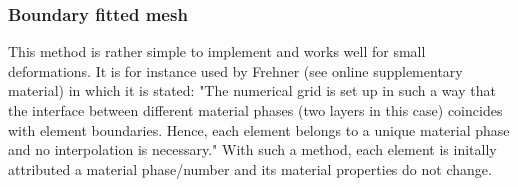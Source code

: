 \subsubsection{Boundary fitted mesh}

This method is rather simple to implement and works well for small deformations. It is 
for instance used by Frehner \cite{freh14} (see online supplementary material) in which it is 
stated: "The numerical grid is set up in such a way that the interface
between different material phases (two layers in this case) coincides with element boundaries. Hence, each
element belongs to a unique material phase and no interpolation is necessary."
With such a method, each element is initally attributed a material phase/number and its material
properties do not change. 








